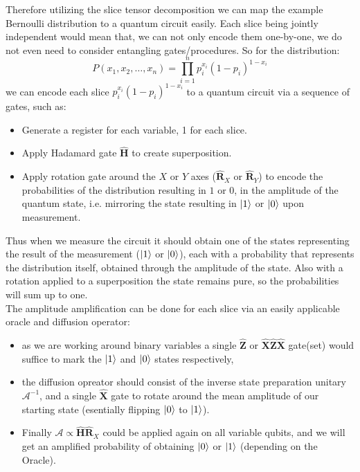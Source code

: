 \documentclass[encoding=utf8,british]{tumphthesis}
\begin{document}
            \begin{tcolorbox}[breakable, width=\linewidth, sharp corners=all, colback=white!95!black]
                Therefore utilizing the slice tensor decomposition we can map the example Bernoulli distribution to a quantum circuit easily.
                Each slice being jointly independent would mean that, we can not only encode them one-by-one, we do not even need to consider entangling gates/procedures.
                So for the distribution:
                \begin{equation*}
                P(x_1, x_2, \dots , x_n) = \prod_{i = 1}^n p_i^{x_i}(1-p_i)^{1-x_i}
                \end{equation*}
                we can encode each slice $p_i^{x_i}(1-p_i)^{1-x_i}$ to a quantum circuit via a sequence of gates, such as:
                \begin{itemize}
                    \item Generate a register for each variable, 1 for each slice.
                    \item Apply Hadamard gate $\hat{\textbf{H}}$ to create superposition.
                    \item Apply rotation gate around the $X$ or $Y$ axes ($\hat{\mathbf{R}}_X$ or $\hat{\mathbf{R}}_Y$) to encode the probabilities of the distribution resulting in $1$ or $0$, 
                    in the amplitude of the quantum state, i.e. mirroring the state resulting in $\left|1\right>$ or $\left|0\right>$ upon measurement.
                \end{itemize}
                Thus when we measure the circuit it should obtain one of the states representing the result of the measurement ($\left|1\right>$ or $\left|0\right>$), each with a probability
                that represents the distribution itself, obtained through the amplitude of the state. Also with a rotation applied to a superposition the state
                remains pure, so the probabilities will sum up to one.
                \\
                The amplitude amplification can be done for each slice via an easily applicable oracle and diffusion operator:
                \begin{itemize}
                    \item as we are working around binary variables a single $\hat{\textbf{Z}}$ or $\hat{\textbf{X}}\hat{\textbf{Z}}\hat{\textbf{X}}$ gate(set) would suffice to mark the 
                    $\left|1\right>$ and $\left|0\right>$ states respectively,
                    \item the diffusion opreator should consist of the inverse state preparation unitary $\mathcal{A}^{-1}$, and a single $\hat{\textbf{X}}$
                    gate to rotate around the mean amplitude of our starting state (esentially flipping $\left|0\right>$ to $\left|1\right>$).
                    \item Finally $\mathcal{A} \propto \hat{\textbf{H}}\hat{\mathbf{R}}_X$ could be applied again on all variable qubits, and we will get an amplified probability 
                    of obtaining $\left|0\right>$ or $\left|1\right>$ (depending on the Oracle).
                \end{itemize}
            \end{tcolorbox}
\end{document}
